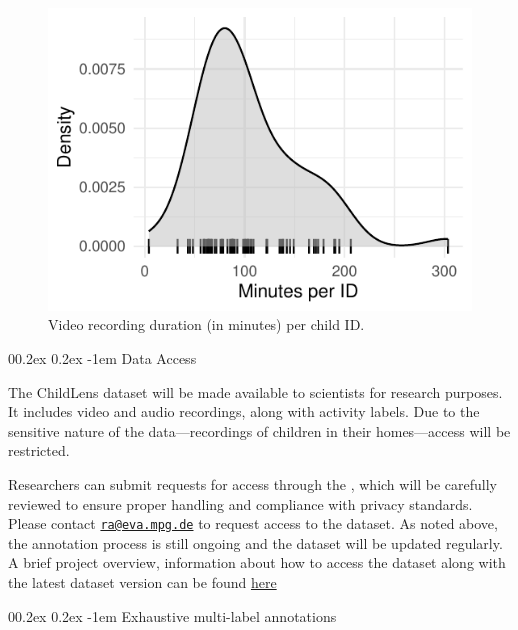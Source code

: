 \documentclass[
  man,floatsintext]{apa6}
\makeatletter
\let\oldparagraph\paragraph
\renewcommand{\paragraph}{
    \@ifstar
      \xxxParagraphStar
      \xxxParagraphNoStar
  }
\newcommand{\xxxParagraphStar}[1]{\oldparagraph*{#1}\mbox{}}
\newcommand{\xxxParagraphNoStar}[1]{\oldparagraph{#1}\mbox{}}
\renewcommand{\paragraph}{\@startsection{paragraph}{4}{\parindent}%
  {0\baselineskip \@plus 0.2ex \@minus 0.2ex}%
  {-1em}%
  {\normalfont\normalsize\bfseries\itshape\typesectitle}}
\makeatother
\begin{document}
\begin{figure}
\centering
\includegraphics{ChildLens_paper_files/figure-latex/minutes-per-child-1.pdf}
\caption{\label{fig:minutes-per-child}Video recording duration (in minutes) per child ID.}
\end{figure}

\paragraph{Data Access}\label{data-access}

The ChildLens dataset will be made available to scientists for research purposes. It includes video and audio recordings, along with activity labels. Due to the sensitive nature of the data---recordings of children in their homes---access will be restricted.

Researchers can submit requests for access through the , which will be carefully reviewed to ensure proper handling and compliance with privacy standards. Please contact \href{mailto:ra@eva.mpg.de}{\nolinkurl{ra@eva.mpg.de}} to request access to the dataset. As noted above, the annotation process is still ongoing and the dataset will be updated regularly. A brief project overview, information about how to access the dataset along with the latest dataset version can be found \href{https://www.eva.mpg.de/comparative-cultural-psychology/technical-development/childlens/}{here}

\paragraph{Exhaustive multi-label annotations}\label{exhaustive-multi-label-annotations}
\end{document}
